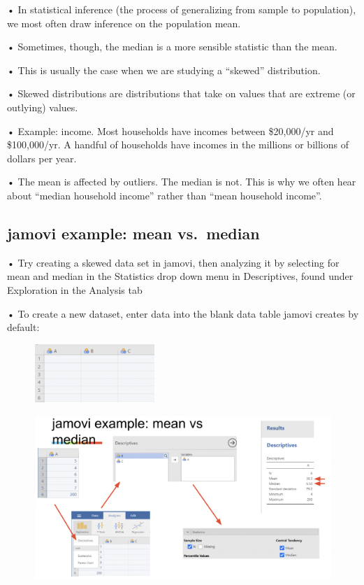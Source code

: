 \documentclass[
  letterpaper,
  DIV=11,
  numbers=noendperiod]{scrreprt}
\begin{document}
• In statistical inference (the process of generalizing from sample to
population), we most often draw inference on the population mean.

• Sometimes, though, the median is a more sensible statistic than the
mean.

• This is usually the case when we are studying a ``skewed''
distribution.

• Skewed distributions are distributions that take on values that are
extreme (or outlying) values.

• Example: income. Most households have incomes between \$20,000/yr and
\$100,000/yr. A handful of households have incomes in the millions or
billions of dollars per year.

• The mean is affected by outliers. The median is not. This is why we
often hear about ``median household income'' rather than ``mean
household income''.

\hypertarget{jamovi-example-mean-vs.-median}{%
\subsection{jamovi example: mean
vs.~median}\label{jamovi-example-mean-vs.-median}}

• Try creating a skewed data set in jamovi, then analyzing it by
selecting for mean and median in the Statistics drop down menu in
Descriptives, found under Exploration in the Analysis tab

• To create a new dataset, enter data into the blank data table jamovi
creates by default:

\begin{figure}

\includegraphics[width=1.78125in,height=\textheight]{images/mod1_2.png} \hfill{}

\end{figure}

\begin{figure}

{\centering \includegraphics{images/mod1_3.png}

}

\end{figure}
\end{document}
